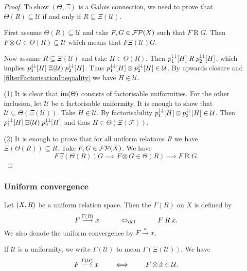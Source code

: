 \begin{proof}
To show $(\Theta,\Xi)$ is a Galois connection, we need to prove that $\Theta(R) \subseteq \mathcal{U}$ \textup{if and only if} $R \subseteq \Xi(\mathcal{U})$.

First assume $\Theta(R) \subseteq \mathcal{U}$ and take $F,G\in\operatorname{\mathcal{FP}}(X)$ such that $F\mathrel{R} G$. Then $F\otimes G\in \Theta(R)\subseteq\mathcal{U}$ which means that $F\mathrel{\Xi(\mathcal{U})}G$.

Now assume $R \subseteq \Xi(\mathcal{U})$ and take $H\in \Theta(R)$. Then $p_1^{\downarrow\downarrow}[H]\mathrel{R}p_2^{\downarrow\downarrow}[H]$, which implies $p_1^{\downarrow\downarrow}[H]\mathrel{\Xi(\mathcal{U})}p_2^{\downarrow\downarrow}[H]$. Thus $p_1^{\downarrow\downarrow}[H]\otimes p_2^{\downarrow\downarrow}[H]\in \mathcal{U}$. By upwards closure and \ref{filterFactorisationInequality} we have $H\in \mathcal{U}$.

(1) It is clear that $\operatorname{im}(\Theta)$ consists of factorisable uniformities. For the other inclusion, let $\mathcal{U}$ be a factorisable uniformity. It is enough to show that $\mathcal{U} \subseteq \Theta(\Xi(\mathcal{U}))$. Take $H\in \mathcal{U}$. By factorisability $p_1^{\downarrow\downarrow}[H]\otimes p_2^{\downarrow\downarrow}[H]\in \mathcal{U}$. Then $p_1^{\downarrow\downarrow}[H]\mathrel{\Xi(\mathcal{U})} p_2^{\downarrow\downarrow}[H]$ and thus $H\in \Theta(\Xi(\mathcal{F}))$.

(2) It is enough to prove that for all uniform relations $R$ we have $\Xi(\Theta(R)) \subseteq R$. Take $F,G\in\operatorname{\mathcal{FP}}(X)$. We have
\[ F\mathrel{\Xi(\Theta(R))} G \implies F\otimes G \in\Theta(R) \implies F\mathrel{R}G. \]
\end{proof}


\subsubsection{Uniform convergence}
\begin{definition}
Let $\left( X,R \right)$ be a uniform relation space. Then the  $\Gamma(R)$ on $X$ is defined by
\[ F \overset{\Gamma(R)}{\longrightarrow} x \qquad\quad\Leftrightarrow_{\text{def}}\quad\qquad F\mathrel{R}\dot{x}. \]
We also denote the uniform convergence by $F\overset{u}{\longrightarrow} x$.
\end{definition}
If $\mathcal{U}$ is a uniformity, we write $\Gamma(\mathcal{U})$ to mean $\Gamma(\Xi(\mathcal{U}))$. We have
\[ F \overset{\Gamma(\mathcal{U})}{\longrightarrow} x \qquad\iff\qquad F\otimes \dot{x}\in\mathcal{U}. \]


